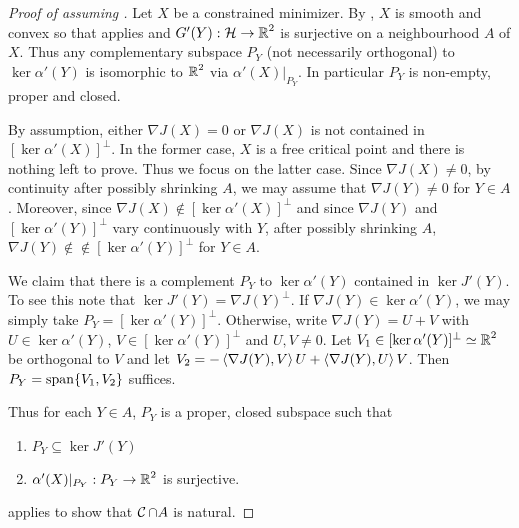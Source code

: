 \documentclass[12pt]{amsart}
\begin{document}
\begin{proof}[Proof of  assuming ]
Let $X$ be a constrained minimizer. By \cite[Theorem 1.1]{denzler2015existence}, $X$ is smooth and convex so that  applies and $G'(Y) : \operatorname{\mathcal{H}} \to \operatorname{\mathbb{R}}^2$ is surjective on a neighbourhood $A$ of $X$. Thus any complementary subspace $P_Y$ (not necessarily orthogonal) to $\ker \alpha'(Y)$ is isomorphic to $\operatorname{\mathbb{R}}^2$ via $\alpha'(X)|_{P_Y}$. In particular $P_Y$ is non-empty, proper and closed.

By assumption, either $\nabla J(X) = 0$ or $\nabla J(X)$ is not contained in $[\ker\alpha'(X)]^{\perp}$. In the former case, $X$ is a free critical point and there is nothing left to prove. Thus we focus on the latter case. Since $\nabla J(X) \ne 0$, by continuity after possibly shrinking $A$, we may assume that $\nabla J(Y) \ne 0$ for $Y \in A$. Moreover, since $\nabla J(X) \notin [\ker\alpha'(X)]^{\perp}$ and since $\nabla J(Y)$ and $[\ker\alpha'(Y)]^{\perp}$ vary continuously with $Y$, after possibly shrinking $A$, $\nabla J(Y) \notin \notin [\ker\alpha'(Y)]^{\perp}$ for $Y \in A$.

We claim that there is a complement $P_Y$ to $\ker\alpha'(Y)$ contained in $\ker J'(Y)$. To see this note that $\ker J'(Y) = \nabla J(Y)^{\perp}$. If $\nabla J(Y) \in \ker\alpha'(Y)$, we may simply take $P_Y = [\ker\alpha'(Y)]^{\perp}$. Otherwise, write $\nabla J(Y) = U + V$ with $U \in \ker\alpha'(Y)$, $V \in [\ker\alpha'(Y)]^{\perp}$ and $U, V \ne 0$. Let $V_1 \in [\ker\alpha'(Y)]^{\perp} \simeq \operatorname{\mathbb{R}}^2$ be orthogonal to $V$ and let $V_2 = -\left\langle{\nabla J(Y)},{V}\right\rangle U + \left\langle{\nabla J(Y)},{U}\right\rangle V$. Then $P_Y = \operatorname{span}\{V_1, V_2\}$ suffices.

Thus for each $Y \in A$, $P_Y$ is a proper, closed subspace such that
\begin{enumerate}
\item $P_Y \subseteq \ker J'(Y)$
\item $\alpha'(X)|_{P_Y} : P_Y \to \operatorname{\mathbb{R}}^2$ is surjective.
\end{enumerate}
 applies to show that $\operatorname{\mathcal{C}} \cap A$ is natural.
\end{proof}
\end{document}
